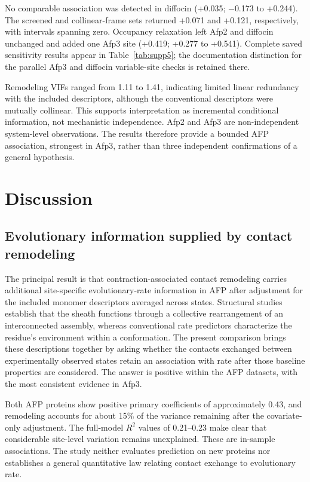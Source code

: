 \documentclass[11pt,a4paper]{article}
\begin{document}
No comparable association was detected in diffocin (+0.035; \ensuremath{-}0.173 to +0.244). The screened and collinear-frame sets returned +0.071 and +0.121, respectively, with intervals spanning zero. Occupancy relaxation left Afp2 and diffocin unchanged and added one Afp3 site (+0.419; +0.277 to +0.541). Complete saved sensitivity results appear in Table~\ref{tab:supp5}; the documentation distinction for the parallel Afp3 and diffocin variable-site checks is retained there.

Remodeling VIFs ranged from 1.11 to 1.41, indicating limited linear redundancy with the included descriptors, although the conventional descriptors were mutually collinear. This supports interpretation as incremental conditional information, not mechanistic independence. Afp2 and Afp3 are non-independent system-level observations. The results therefore provide a bounded AFP association, strongest in Afp3, rather than three independent confirmations of a general hypothesis.

\section{Discussion}

\subsection{Evolutionary information supplied by contact remodeling}

The principal result is that contraction-associated contact remodeling carries additional site-specific evolutionary-rate information in AFP after adjustment for the included monomer descriptors averaged across states. Structural studies establish that the sheath functions through a collective rearrangement of an interconnected assembly,\cite{ref1,ref2} whereas conventional rate predictors characterize the residue's environment within a conformation.\cite{ref5,ref6} The present comparison brings these descriptions together by asking whether the contacts exchanged between experimentally observed states retain an association with rate after those baseline properties are considered. The answer is positive within the AFP datasets, with the most consistent evidence in Afp3.

Both AFP proteins show positive primary coefficients of approximately 0.43, and remodeling accounts for about 15\% of the variance remaining after the covariate-only adjustment. The full-model \(R^2\) values of 0.21--0.23 make clear that considerable site-level variation remains unexplained. These are in-sample associations. The study neither evaluates prediction on new proteins nor establishes a general quantitative law relating contact exchange to evolutionary rate.
\end{document}

